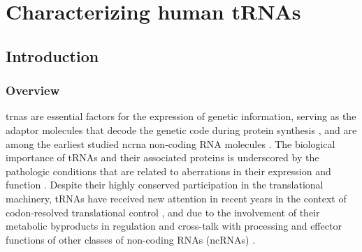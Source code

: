 \documentclass[12pt]{rockefeller}
\begin{document}


\printglossary[type=\acronymtype,nonumberlist,title={List of Abbreviations}]
\printglossary[nonumberlist,title={Glossary}]
\mainmatter
\pagestyle{fancy}
\fancyhf{}
\lhead{\chaptername\ \thechapter}
\rhead{\thesection}
\rfoot{\thepage}

\part{Characterizing human tRNAs}
\chapter{Introduction}
\section{Overview}
\Glspl{trna} are essential factors for the expression of genetic information, serving as the adaptor molecules that decode the genetic code during protein synthesis \cite{Crick:1955}, and are among the earliest studied \gls{ncrna} non-coding RNA molecules \cite{Woese:1967, Soll:1995}. The biological importance of tRNAs and their associated proteins is underscored by the pathologic conditions that are related to aberrations in their expression and function \cite{Cooper:2009da, Park:2008gg, Griffiths:2011ge, McFarland:2004fz}.
Despite their highly conserved participation in the translational machinery, tRNAs have received new attention in recent years in the context of codon-resolved translational control \cite{Dana:2012kq,Dana:2014bs,Mahlab:2012dg,Plotkin:2010fu,Tuller:2010ge,Weinberg:2016kh}, and due to the involvement of their metabolic byproducts in regulation and cross-talk with processing and effector functions of other classes of non-coding RNAs (ncRNAs) \cite{Hasler:2016ce,Ivanov:2011iu,Lee:2009fb,Haussecker:2010hda, Babiarz:2008bs}.
\end{document}
